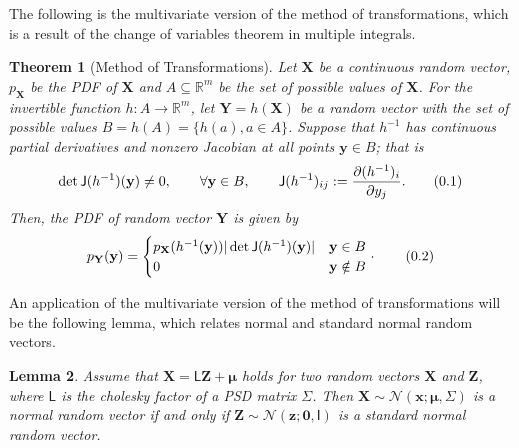 \documentclass[10pt]{article}
\newtheorem{thm}{Theorem}[section]
\newtheorem{lem}[thm]{Lemma}
\theoremstyle{definition}
\newcommand\eqnum{\addtocounter{equation}{1}\tag{\arabic{section}.\arabic{equation}}}
\begin{document}
The following is the multivariate version of the method of transformations, which is a result of the change of variables theorem in multiple integrals.
\begin{thm}[Method of Transformations]\label{thm:MT:MV}
Let $\mathbf{X}$ be a continuous random vector, $p_\mathbf{X}$ be the PDF of $\mathbf{X}$ and $A\subseteq\mathbb{R}^m$ be the set of possible values of $\mathbf{X}$. For the invertible function $h:A\to\mathbb{R}^m$, let $\mathbf{Y}=h(\mathbf{X})$ be a random vector with the set of possible values $B=h(A)=\{h(a), a\in A\}$. Suppose that $h^{-1}$ has continuous partial derivatives and nonzero Jacobian at all points $\mathbf{y}\in B$; that is
\begin{equation*}
\det\mathsf{J}(h^{-1})(\mathbf{y})\ne 0, \qquad \forall \mathbf{y}\in B, \qquad \mathsf{J}(h^{-1})_{ij} := \frac{\partial (h^{-1})_i}{\partial y_j}.
\eqnum
\end{equation*}
Then, the PDF of random vector $\mathbf{Y}$ is given by
\begin{equation*}
p_{\mathbf{Y}}(\mathbf{y}) = 
\begin{cases}
p_{\mathbf{X}}(h^{-1}(\mathbf{y})) |\det\mathsf{J}(h^{-1})(\mathbf{y})| & \mathbf{y} \in B \\
0 & \mathbf{y} \notin B
\end{cases}
\cdot
\eqnum
\end{equation*}
\end{thm}
An application of the multivariate version of the method of transformations will be the following lemma, which relates normal and standard normal random vectors.
\begin{lem}
Assume that $\mathbf{X}=\mathsf{L}\mathbf{Z}+\boldsymbol{\mu}$ holds for two random vectors $\mathbf{X}$ and $\mathbf{Z}$, where $\mathsf{L}$ is the cholesky factor of a PSD matrix $\mathsf{\Sigma}$. Then $\mathbf{X}\sim\mathcal{N}(\mathbf{x};\boldsymbol{\mu},\mathsf{\Sigma})$ is a normal random vector if and only if $\mathbf{Z}\sim\mathcal{N}(\mathbf{z};\mathbf{0},\mathsf{I})$ is a standard normal random vector.
\end{lem}
\end{document}
